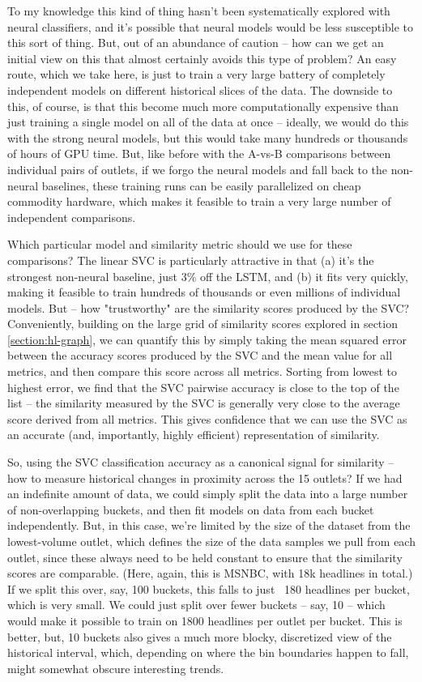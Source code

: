 \documentclass{scrartcl}
\begin{document}
To my knowledge this kind of thing hasn't been systematically explored with neural classifiers, and it's possible that neural models would be less susceptible to this sort of thing. But, out of an abundance of caution -- how can we get an initial view on this that almost certainly avoids this type of problem? An easy route, which we take here, is just to train a very large battery of completely independent models on different historical slices of the data. The downside to this, of course, is that this become much more computationally expensive than just training a single model on all of the data at once -- ideally, we would do this with the strong neural models, but this would take many hundreds or thousands of hours of GPU time. But, like before with the A-vs-B comparisons between individual pairs of outlets, if we forgo the neural models and fall back to the non-neural baselines, these training runs can be easily parallelized on cheap commodity hardware, which makes it feasible to train a very large number of independent comparisons.

Which particular model and similarity metric should we use for these comparisons? The linear SVC is particularly attractive in that (a) it's the strongest non-neural baseline, just 3\% off the LSTM, and (b) it fits very quickly, making it feasible to train hundreds of thousands or even millions of individual models. But -- how "trustworthy" are the similarity scores produced by the SVC? Conveniently, building on the large grid of similarity scores explored in section \ref{section:hl-graph}, we can quantify this by simply taking the mean squared error between the accuracy scores produced by the SVC and the mean value for all metrics, and then compare this score across all metrics. Sorting from lowest to highest error, we find that the SVC pairwise accuracy is close to the top of the list -- the similarity measured by the SVC is generally very close to the average score derived from all metrics. This gives confidence that we can use the SVC as an accurate (and, importantly, highly efficient) representation of similarity.

So, using the SVC classification accuracy as a canonical signal for similarity -- how to measure historical changes in proximity across the 15 outlets? If we had an indefinite amount of data, we could simply split the data into a large number of non-overlapping buckets, and then fit models on data from each bucket independently. But, in this case, we're limited by the size of the dataset from the lowest-volume outlet, which defines the size of the data samples we pull from each outlet, since these always need to be held constant to ensure that the similarity scores are comparable. (Here, again, this is MSNBC, with 18k headlines in total.) If we split this over, say, 100 buckets, this falls to just ~180 headlines per bucket, which is very small. We could just split over fewer buckets -- say, 10 -- which would make it possible to train on 1800 headlines per outlet per bucket. This is better, but, 10 buckets also gives a much more blocky, discretized view of the historical interval, which, depending on where the bin boundaries happen to fall, might somewhat obscure interesting trends.
\end{document}

